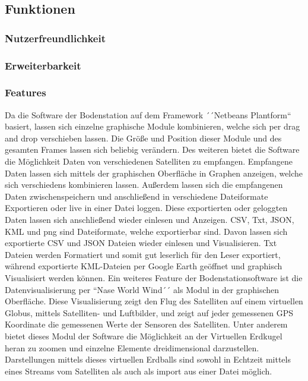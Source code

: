 \subsection{Funktionen}
\subsubsection{Nutzerfreundlichkeit}

\subsubsection{Erweiterbarkeit}

\subsubsection{Features}
Da die Software der Bodenstation auf dem Framework ´´Netbeans Plantform`` basiert, lassen sich einzelne graphische Module kombinieren, welche sich per drag and drop verschieben lassen. Die Größe und Position dieser Module und des gesamten Frames lassen sich beliebig verändern. Des weiteren bietet die Software die Möglichkeit Daten von verschiedenen Satelliten zu empfangen. Empfangene Daten lassen sich mittels der graphischen Oberfläche in Graphen anzeigen, welche sich verschiedens kombinieren lassen. Außerdem lassen sich die empfangenen Daten zwischenspeichern und anschließend in verschiedene Dateiformate Exportieren oder live in einer Datei loggen. Diese exportierten oder geloggten Daten lassen sich anschließend wieder einlesen und Anzeigen. CSV, Txt, JSON, KML und png sind Dateiformate, welche exportierbar sind. Davon lassen sich exportierte CSV und JSON Dateien wieder einlesen und Visualisieren. Txt Dateien werden Formatiert und somit gut leserlich für den Leser exportiert, während exportierte KML-Dateien per Google Earth geöffnet und graphisch Visualisiert werden können. Ein weiteres Feature der Bodenstationsoftware ist die Datenvisualisierung per ``Nase World Wind´´ als Modul in der graphischen Oberfläche. Diese Visualisierung zeigt den Flug des Satelliten auf einem virtuellen Globus, mittels Satelliten- und Luftbilder, und zeigt auf jeder gemessenen GPS Koordinate die gemessenen Werte der Sensoren des Satelliten. Unter anderem bietet dieses Modul der Software die Möglichkeit an der Virtuellen Erdkugel heran zu zoomen und einzelne Elemente dreidimensional darzustellen. Darstellungen mittels dieses virtuellen Erdballs sind sowohl in Echtzeit mittels eines Streams vom Satelliten als auch als import aus einer Datei möglich.
